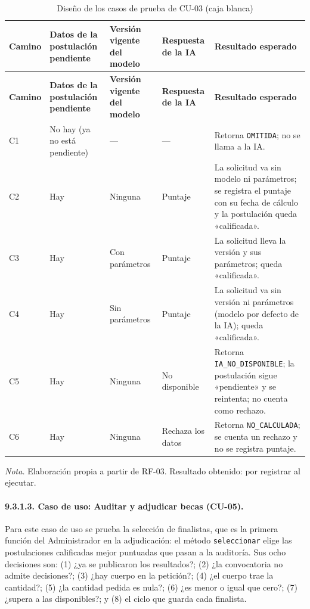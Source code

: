 \begin{longtable}{@{}>{\raggedright\arraybackslash}p{1.3cm}>{\raggedright\arraybackslash}p{2.0cm}>{\raggedright\arraybackslash}p{2.4cm}>{\raggedright\arraybackslash}p{2.3cm}>{\raggedright\arraybackslash}p{5.0cm}@{}}
\caption{Diseño de los casos de prueba de CU-03 (caja blanca)}\label{tab:dcp_cu03}\\
\toprule
\textbf{Camino} & \textbf{Datos de la postulación pendiente} & \textbf{Versión vigente del modelo} & \textbf{Respuesta de la IA} & \textbf{Resultado esperado} \\
\midrule
\endfirsthead
\toprule
\textbf{Camino} & \textbf{Datos de la postulación pendiente} & \textbf{Versión vigente del modelo} & \textbf{Respuesta de la IA} & \textbf{Resultado esperado} \\
\midrule
\endhead
\bottomrule
\endfoot
C1 & No hay (ya no está pendiente) & --- & --- & Retorna \texttt{OMITIDA}; no se llama a la IA. \\
C2 & Hay & Ninguna & Puntaje & La solicitud va sin modelo ni parámetros; se registra el puntaje con su fecha de cálculo y la postulación queda «calificada». \\
C3 & Hay & Con parámetros & Puntaje & La solicitud lleva la versión y sus parámetros; queda «calificada». \\
C4 & Hay & Sin parámetros & Puntaje & La solicitud va sin versión ni parámetros (modelo por defecto de la IA); queda «calificada». \\
C5 & Hay & Ninguna & No disponible & Retorna \texttt{IA\_NO\_DISPONIBLE}; la postulación sigue «pendiente» y se reintenta; no cuenta como rechazo. \\
C6 & Hay & Ninguna & Rechaza los datos & Retorna \texttt{NO\_CALCULADA}; se cuenta un rechazo y no se registra puntaje. \\
\end{longtable}
\noindent\textit{Nota.} Elaboración propia a partir de RF-03. Resultado obtenido: por registrar al ejecutar.

\paragraph{9.3.1.3. Caso de uso: Auditar y adjudicar becas (CU-05).}

Para este caso de uso se prueba la selección de finalistas, que es la primera función del Administrador en la adjudicación: el método \texttt{seleccionar} elige las postulaciones calificadas mejor puntuadas que pasan a la auditoría. Sus ocho decisiones son: (1) ¿ya se publicaron los resultados?; (2) ¿la convocatoria no admite decisiones?; (3) ¿hay cuerpo en la petición?; (4) ¿el cuerpo trae la cantidad?; (5) ¿la cantidad pedida es nula?; (6) ¿es menor o igual que cero?; (7) ¿supera a las disponibles?; y (8) el ciclo que guarda cada finalista.

